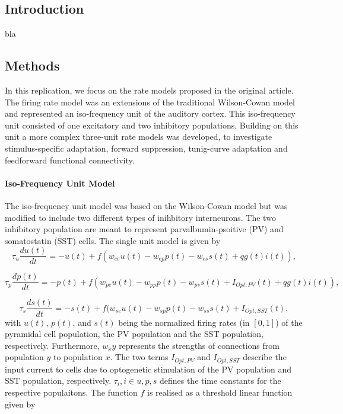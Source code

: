\subsection{Introduction}


bla


\subsection{Methods}
In this replication, we focus on the rate models proposed in the original article.
The firing rate model was an extensions of the traditional Wilson-Cowan model \supercite{wilson1972excitatory} and represented
an iso-frequency unit of the auditory cortex. This iso-frequency unit consisted of one excitatory and two inhibitory populations.
Building on this unit a more complex three-unit rate models was developed, to investigate stimulus-specific adaptation, forward suppression,
tunig-curve adaptation and feedforward functional connectivity. 

\paragraph{Iso-Frequency Unit Model}

The iso-frequency unit model was based on the Wilson-Cowan model \supercite{wilson1972excitatory} but was modified to include two different types of
inihbitory interneurons. The two inhibitory population are meant to represent parvalbumin-psoitive (PV) and somatostatin (SST) cells. The single unit
model is given by 
\begin{equation}
 \tau_u \frac{du(t)}{dt} = -u(t) + f(w_{ee}u(t) - w_{ep}p(t)- w_{es}s(t) + qg(t)i(t)), 
\end{equation}
 
\begin{equation}
 \tau_p \frac{dp(t)}{dt} = -p(t) + f(w_{pe}u(t) - w_{pp}p(t)- w_{ps}s(t) + I_{Opt,PV}(t) + qg(t)i(t)),
\end{equation}
 
\begin{equation} 
 \tau_s \frac{ds(t)}{dt} = -s(t) + f(w_{se}u(t) - w_{sp}p(t)- w_{ss}s(t) + I_{Opt,SST}(t),
\end{equation}
with $u(t)$, $p(t)$, and $s(t)$ being the normalized firing rates (in $[0,1]$) of the pyramidal cell population, the PV population and the SST population,
respectively. Furthermore, $w_xy$ represents the strengths of connections from population $y$ to population $x$. The two terms $I_{Opt,PV}$ and 
$I_{Opt,SST}$ describe the  input current to cells due to optogenetic stimulation of the PV population and SST population, respectively.
$\tau_i, i \in {u,p,s}$ defines the time constants for the respective populaitons. The function $f$ is realised as a threshold linear function
given by

